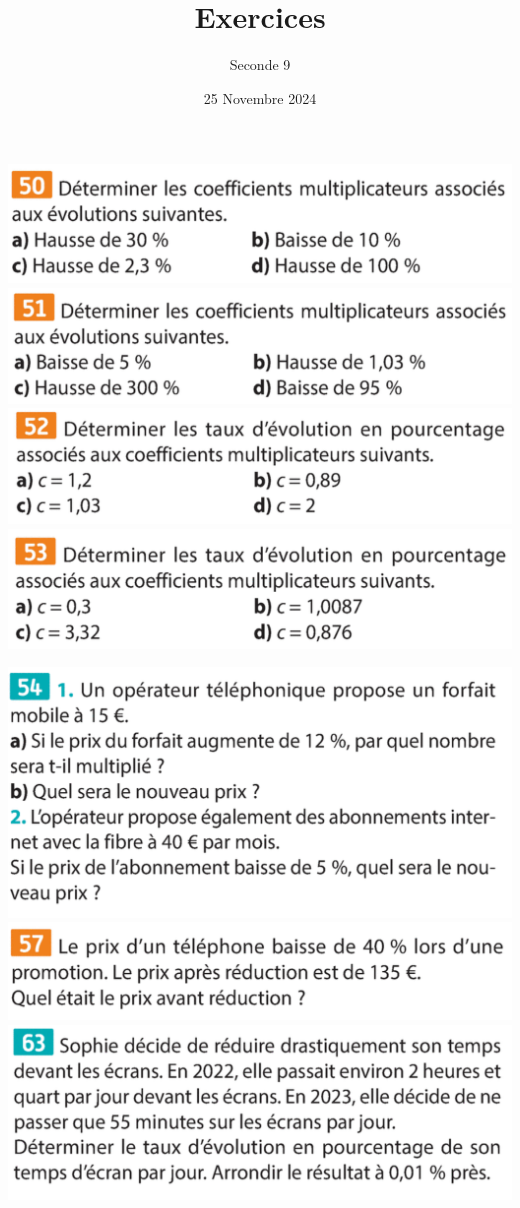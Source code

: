\documentclass{article}
\title{Exercices}
\date{25 Novembre 2024}
\author{Seconde 9}
\begin{document}
\maketitle
\begin{minipage}{0.45\textwidth}
\includegraphics[width=\textwidth]{Exercice_1.png}
\includegraphics[width=\textwidth]{Exercice_2.png}
\includegraphics[width=\textwidth]{Exercice_3.png}
\includegraphics[width=\textwidth]{Exercice_4.png}
\end{minipage}
\hfill\vline\hfill
\begin{minipage}{0.45\textwidth}
\includegraphics[width=\textwidth]{Exercice_5.png}
\includegraphics[width=\textwidth]{Exercice_6.png}
\includegraphics[width=\textwidth]{Exercice_7.png}
\end{minipage}
\end{document}
